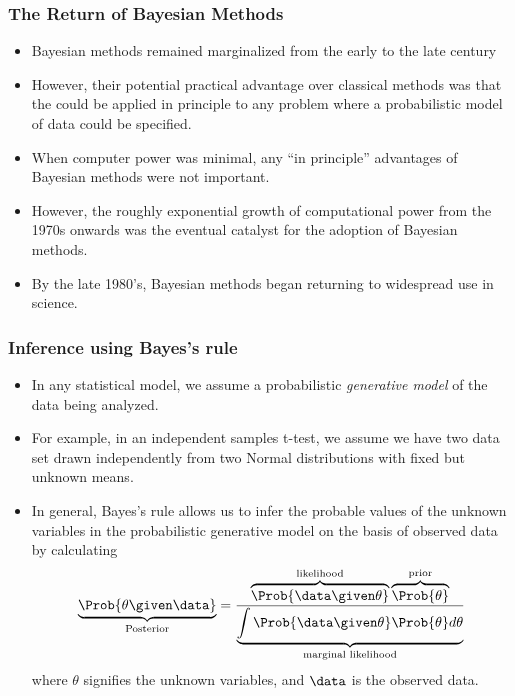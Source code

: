 \documentclass{slides}
\begin{document}
\begin{frame}
	\frametitle{The Return of Bayesian Methods}
	
	\begin{itemize}

		\item Bayesian methods remained marginalized from the early to
			the late  century

		\item However, their potential practical advantage over
			classical methods was that the could be applied in
			principle to any problem where a probabilistic model of
			data could be specified.  

		\item When computer power was minimal, any ``in principle''
			advantages of Bayesian methods were not important.

		\item However, the roughly exponential growth of computational
			power from the 1970s onwards was the eventual catalyst
			for the adoption of Bayesian methods.

		\item By the late 1980's, Bayesian methods began returning to
			widespread use in science.

	\end{itemize}
\end{frame}

\begin{frame}
	\frametitle{Inference using Bayes's rule}
	\begin{itemize}

		\item In any statistical model, we assume a probabilistic \emph{generative model} of the data being analyzed.
		\item For example, in an independent samples t-test, we assume we have two data set drawn independently from two Normal distributions with fixed but unknown means.
		\item In general, Bayes's rule allows us to infer the probable values of the unknown variables in the probabilistic generative model on the basis of observed data by calculating
		\[
			\underbrace{\Prob{\theta \given \data}}_{\text{Posterior}}
			= 
			\frac{\overbrace{\Prob{\data \given \theta}}^{\text{likelihood}}
				\overbrace{\Prob{\theta}}^{\text{prior}}}
				{\underbrace{\int \Prob{\data \given \theta}\Prob{\theta} d\theta}_{\text{marginal likelihood}}}
		\]
		where $\theta$ signifies the unknown variables, and $\data$ is the observed data.


	\end{itemize}

\end{frame}
\end{document}
